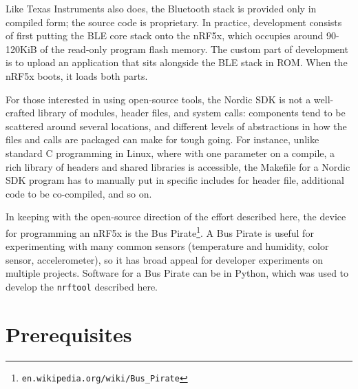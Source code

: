 \documentclass{article}
\begin{document}
Like Texas Instruments also does, the Bluetooth stack is provided only in compiled form; the source code is 
proprietary. In practice, development consists of first putting the BLE core stack onto the nRF5x, which 
occupies around 90-120KiB of the read-only program flash memory. The custom part of development is to 
upload an application that sits alongside the BLE stack in ROM. When the nRF5x boots, it loads both parts. 
\par
For those interested in using open-source tools, the Nordic SDK is not a well-crafted library of 
modules, header files, and system calls: components tend to be scattered around several locations, 
and different levels of abstractions in how the files and calls are packaged can make for tough going. 
For instance, unlike standard C programming in Linux, where with one parameter on a compile, a rich library
of headers and shared libraries is accessible, the Makefile for a Nordic SDK program has to manually 
put in specific includes for header file, additional code to be co-compiled, and so on. 
\par
In keeping with the open-source direction of the effort described here, the device for programming 
an nRF5x is the Bus Pirate\footnote{\texttt{en.wikipedia.org/wiki/Bus\_Pirate}}. A Bus Pirate is useful for 
experimenting with many common sensors (temperature and humidity, color sensor, accelerometer), so it 
has broad appeal for developer experiments on multiple projects. Software for a Bus Pirate can be 
in Python, which was used to develop the \texttt{nrftool} described here. 

\section*{Prerequisites}
\end{document}
